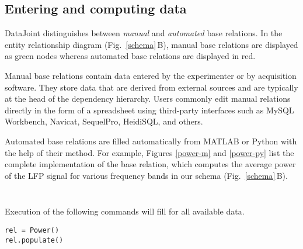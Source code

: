 \subsection*{Entering and computing data}
DataJoint distinguishes between \emph{manual} and \emph{automated} base relations. 
In the entity relationship diagram (Fig.\ \ref{schema}\,B), manual base relations are displayed as green nodes whereas automated base relations are displayed in red.

Manual base relations contain data entered by the experimenter or by acquisition software.
They store data that are derived from external sources and are typically at the head of the dependency hierarchy.
Users commonly edit manual relations directly in the form of a spreadsheet using third-party interfaces such as MySQL Workbench, Navicat, SequelPro, HeidiSQL, and others. 

Automated base relations are filled automatically from MATLAB or Python with the help of their  method. 
For example, Figures \ref{power-m} and \ref{power-py} list the complete implementation of the  base relation, which computes the average power of the LFP signal for various frequency bands in our schema (Fig.\ \ref{schema}\,B).

\begin{figure*}

\inputminted[frame=single,linenos=true]{matlab}{Power.m}
\caption{The class for the base relation  in MATLAB.}
\label{power-m}

\end{figure*}

\begin{figure*}

\inputminted[frame=single,linenos=true]{python}{power.py}
\caption{The class for the base relation  in Python.}
\label{power-py}
\end{figure*}

Execution of the following commands will fill  for all available data.
\begin{verbatim}
rel = Power()
rel.populate()
\end{verbatim}

